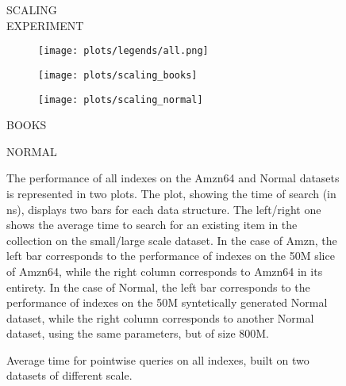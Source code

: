 \documentclass{article}
\begin{document}
\begin{figure}[!htb]
\fbox
{
\begin{minipage}[t][][t]{0.95\textwidth}
\centering
\vspace*{-7px}
    \begin{minipage}{0.2\linewidth}
    \footnotesize{SCALING \\ EXPERIMENT}
    \end{minipage}
   \begin{minipage}{0.75\linewidth}
        \begin{figure}[H]
        \texttt{[image: plots/legends/all.png]}
        \end{figure}
    \end{minipage}
    \vspace*{-12px}

    \begin{minipage}{0.47\linewidth}
        \begin{figure}[H]
        \texttt{[image: plots/scaling\_books]}
        \end{figure}
    \end{minipage}
    \begin{minipage}{0.47\linewidth}
        \begin{figure}[H]
            \texttt{[image: plots/scaling\_normal]}
        \end{figure}
    \end{minipage}
    \begin{minipage}{0.48\linewidth}
    \begin{center}
        BOOKS
    \end{center}
    \end{minipage}
    \begin{minipage}{0.48\linewidth}
    \begin{center}
        NORMAL
    \end{center}
    \end{minipage}

\vspace{10px}
\centering
\begin{minipage}{\linewidth}
    The performance of all indexes on the Amzn64 and Normal datasets is represented in two plots. The plot, showing the time of search (in ns), displays two bars for each data structure. The left/right one shows the average time to search for an existing item in the collection on the small/large scale dataset. In the case of Amzn, the left bar corresponds to the performance of indexes on the 50M slice of Amzn64, while the right column corresponds to Amzn64 in its entirety. In the case of Normal, the left bar corresponds to the performance of indexes on the 50M syntetically generated Normal dataset, while the right column corresponds to another Normal dataset, using the same parameters, but of size 800M.
    \end{minipage}
    \vspace{10px}
\end{minipage}
}
\caption{Average time for pointwise queries on all indexes, built on two datasets of different scale.}
\end{figure}
\end{document}
